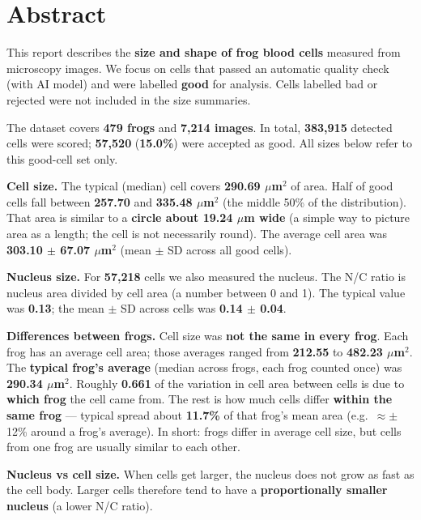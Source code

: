 \documentclass[
  english,
]{article}
\begin{document}
\section{Abstract}\label{abstract}
\begin{abstractbox}
This report describes the \textbf{size and shape of frog blood cells}
measured from microscopy images. We focus on cells that passed an
automatic quality check (with AI model) and were labelled \textbf{good}
for analysis. Cells labelled bad or rejected were not included in the
size summaries.

The dataset covers \textbf{479 frogs} and \textbf{7,214 images}. In
total, \textbf{383,915} detected cells were scored; \textbf{57,520}
(\textbf{15.0\%}) were accepted as good. All sizes below refer to this
good-cell set only.

\textbf{Cell size.} The typical (median) cell covers \textbf{290.69
\(\mu\)m\(^2\)} of area. Half of good cells fall between \textbf{257.70}
and \textbf{335.48 \(\mu\)m\(^2\)} (the middle 50\% of the
distribution). That area is similar to a \textbf{circle about 19.24
\(\mu\)m wide} (a simple way to picture area as a length; the cell is
not necessarily round). The average cell area was \textbf{303.10 \(\pm\)
67.07 \(\mu\)m\(^2\)} (mean \(\pm\) SD across all good cells).

\textbf{Nucleus size.} For \textbf{57,218} cells we also measured the
nucleus. The N/C ratio is nucleus area divided by cell area (a number
between 0 and 1). The typical value was \textbf{0.13}; the mean \(\pm\)
SD across cells was \textbf{0.14 \(\pm\) 0.04}.

\textbf{Differences between frogs.} Cell size was \textbf{not the same
in every frog}. Each frog has an average cell area; those averages
ranged from \textbf{212.55} to \textbf{482.23 \(\mu\)m\(^2\)}. The
\textbf{typical frog's average} (median across frogs, each frog counted
once) was \textbf{290.34 \(\mu\)m\(^2\)}. Roughly \textbf{0.661} of the
variation in cell area between cells is due to \textbf{which frog} the
cell came from. The rest is how much cells differ \textbf{within the
same frog} --- typical spread about \textbf{11.7\%} of that frog's mean
area (e.g.~\(\approx\pm\) 12\% around a frog's average). In short: frogs
differ in average cell size, but cells from one frog are usually similar
to each other.

\textbf{Nucleus vs cell size.} When cells get larger, the nucleus does
not grow as fast as the cell body. Larger cells therefore tend to have a
\textbf{proportionally smaller nucleus} (a lower N/C ratio).
\end{abstractbox}
\end{document}
